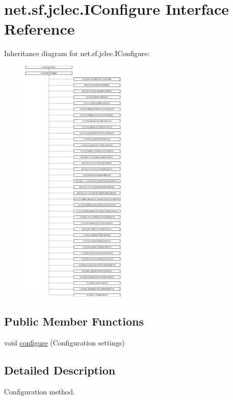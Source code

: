\hypertarget{interfacenet_1_1sf_1_1jclec_1_1_i_configure}{\section{net.\-sf.\-jclec.\-I\-Configure Interface Reference}
\label{interfacenet_1_1sf_1_1jclec_1_1_i_configure}
}
Inheritance diagram for net.\-sf.\-jclec.\-I\-Configure\-:\begin{figure}[H]
\begin{center}
\leavevmode
\includegraphics[height=12.000000cm]{interfacenet_1_1sf_1_1jclec_1_1_i_configure}
\end{center}
\end{figure}
\subsection*{Public Member Functions}
\begin{DoxyCompactItemize}
\item 
void \hyperlink{interfacenet_1_1sf_1_1jclec_1_1_i_configure_add31a65a04d148c690a956fbbad6987c}{configure} (Configuration settings)
\end{DoxyCompactItemize}


\subsection{Detailed Description}
Configuration method.

